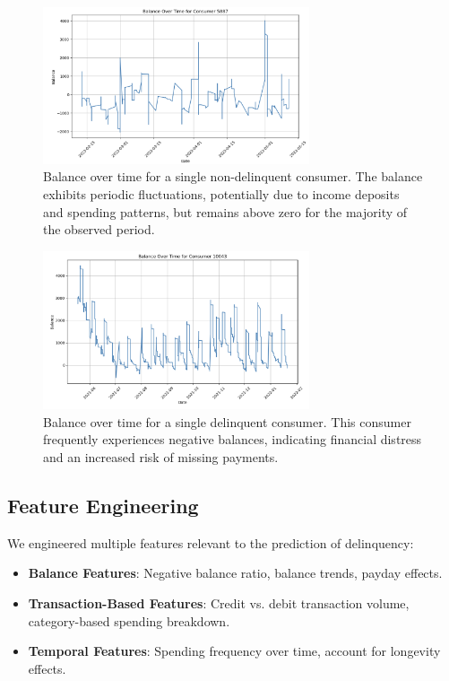 \documentclass[12pt,letterpaper]{article}
\begin{document}
\begin{figure}[H]
    \centering
    \includegraphics[width=0.7\textwidth]{figure/balance_single_non_delinquent.png}
    \caption{Balance over time for a single non-delinquent consumer. The balance exhibits periodic fluctuations, potentially due to income deposits and spending patterns, but remains above zero for the majority of the observed period.}
    \label{fig:balance_single_non_delinquent}
\end{figure}

\begin{figure}[H]
    \centering
    \includegraphics[width=0.7\textwidth]{figure/balance_single_delinquent.png}
    \caption{Balance over time for a single delinquent consumer. This consumer frequently experiences negative balances, indicating financial distress and an increased risk of missing payments.}
    \label{fig:balance_single_delinquent}
\end{figure}


\subsection{Feature Engineering}
We engineered multiple features relevant to the prediction of delinquency:
\begin{itemize}
    \item \textbf{Balance Features}: Negative balance ratio, balance trends, payday effects.
    \item \textbf{Transaction-Based Features}: Credit vs. debit transaction volume, category-based spending breakdown.
    \item \textbf{Temporal Features}: Spending frequency over time, account for longevity effects.
\end{itemize}
\end{document}
